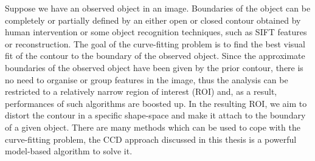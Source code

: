 Suppose we have an observed object in an
image. Boundaries of the object can be completely or partially defined
by an either open or closed contour obtained by human intervention or
some object recognition techniques, such as SIFT features or reconstruction. The goal of
the curve-fitting problem is to find the best visual fit of the contour to the boundary of
the observed object. Since the approximate boundaries of the observed
object have been given by the prior contour, there is no need to organise or group features in the
image, thus the analysis can be restricted to a relatively narrow
region of interest (ROI) and, as a result, performances of such algorithms
are boosted up. In the resulting ROI, we aim to distort the contour in a specific
shape-space and make it attach to the boundary of a given
object. There are many methods which can be used to cope with the
curve-fitting problem, the CCD approach discussed in this
thesis is a powerful model-based algorithm to solve it.

